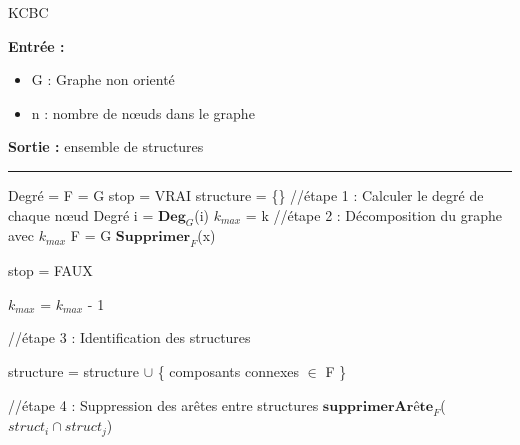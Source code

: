 \documentclass[a4paper,oneside,12pt]{report}
\theoremstyle{definition}
\begin{document}
\begin{algorithm}[H]
					\label{alg:KCBC}
					\caption{KCBC}
					\textbf{Entrée :}
						\begin{itemize}[label=$\bullet$]
							\item G : Graphe non orienté
							\item n : nombre de nœuds dans le graphe 
							
						\end{itemize}
					\textbf{Sortie :} ensemble de structures\\							\noindent\rule{\textwidth}{1pt}
						
						
				\begin{algorithmic} [1]
				\STATE Degré = 	\lbrack \rbrack
				\STATE F = G
				\STATE stop = VRAI
				\STATE structure = \{\}
				\STATE //étape 1 : Calculer le degré de chaque nœud
					  \STATE Degré \lbrack i \rbrack = $\textbf{Deg}_G$(i)
					  \ENDFOR
					  \STATE $k_{max}$ = k
						\STATE //étape 2 : Décomposition du graphe avec $k_{max}$
						\STATE F = G
							\STATE $\textbf{Supprimer}_F$(x) 
							\ENDIF
							
						\ENDFOR
						
							\STATE stop = FAUX
						
					\ELSE
						\STATE $k_{max}$ = $k_{max}$ - 1
					\ENDIF
					\ENDWHILE 
					
					
					\STATE //étape 3 : Identification des structures 
					
					\STATE structure = structure $\cup$ \{ composants connexes $ \in $ F \}
					 
					 \STATE //étape 4 : Suppression des arêtes entre structures
					 \STATE $\textbf{supprimerArête}_F$($struct_i \cap struct_j$)   
					 \ENDFOR
				\end{algorithmic}
			\end{algorithm}

\newpage
\label{Louvain}
\end{document}
